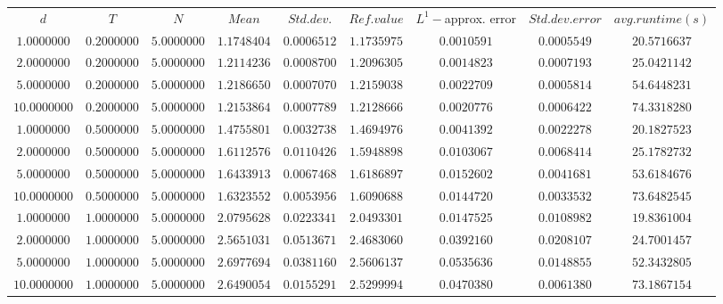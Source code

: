 \begin{tabular}{ccccccccc}
$d$ & $T$ & $N$ & $Mean$ & $Std. dev.$ & $Ref. value$ & $L^1-$approx. error & $Std. dev. error$ & $avg. runtime (s)$\\
$1.0000000$ & $0.2000000$ & $5.0000000$ & $1.1748404$ & $0.0006512$ & $1.1735975$ & $0.0010591$ & $0.0005549$ & $20.5716637$\\
$2.0000000$ & $0.2000000$ & $5.0000000$ & $1.2114236$ & $0.0008700$ & $1.2096305$ & $0.0014823$ & $0.0007193$ & $25.0421142$\\
$5.0000000$ & $0.2000000$ & $5.0000000$ & $1.2186650$ & $0.0007070$ & $1.2159038$ & $0.0022709$ & $0.0005814$ & $54.6448231$\\
$10.0000000$ & $0.2000000$ & $5.0000000$ & $1.2153864$ & $0.0007789$ & $1.2128666$ & $0.0020776$ & $0.0006422$ & $74.3318280$\\
$1.0000000$ & $0.5000000$ & $5.0000000$ & $1.4755801$ & $0.0032738$ & $1.4694976$ & $0.0041392$ & $0.0022278$ & $20.1827523$\\
$2.0000000$ & $0.5000000$ & $5.0000000$ & $1.6112576$ & $0.0110426$ & $1.5948898$ & $0.0103067$ & $0.0068414$ & $25.1782732$\\
$5.0000000$ & $0.5000000$ & $5.0000000$ & $1.6433913$ & $0.0067468$ & $1.6186897$ & $0.0152602$ & $0.0041681$ & $53.6184676$\\
$10.0000000$ & $0.5000000$ & $5.0000000$ & $1.6323552$ & $0.0053956$ & $1.6090688$ & $0.0144720$ & $0.0033532$ & $73.6482545$\\
$1.0000000$ & $1.0000000$ & $5.0000000$ & $2.0795628$ & $0.0223341$ & $2.0493301$ & $0.0147525$ & $0.0108982$ & $19.8361004$\\
$2.0000000$ & $1.0000000$ & $5.0000000$ & $2.5651031$ & $0.0513671$ & $2.4683060$ & $0.0392160$ & $0.0208107$ & $24.7001457$\\
$5.0000000$ & $1.0000000$ & $5.0000000$ & $2.6977694$ & $0.0381160$ & $2.5606137$ & $0.0535636$ & $0.0148855$ & $52.3432805$\\
$10.0000000$ & $1.0000000$ & $5.0000000$ & $2.6490054$ & $0.0155291$ & $2.5299994$ & $0.0470380$ & $0.0061380$ & $73.1867154$\\
\end{tabular}
